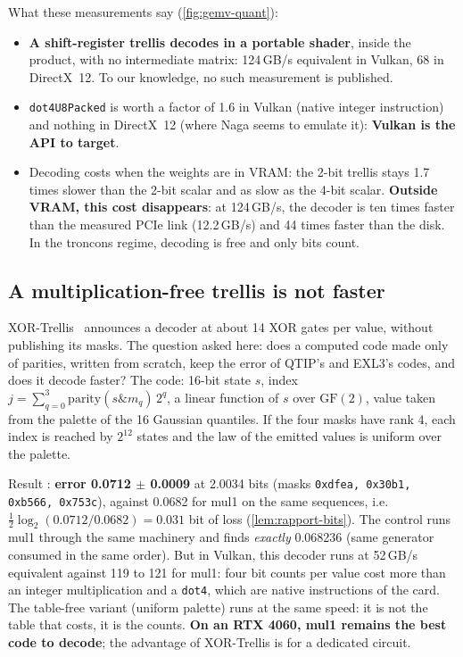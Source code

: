 What these measurements say (\cref{fig:gemv-quant}):
\begin{itemize}
\item \textbf{A shift-register trellis decodes in a portable shader}, inside the product, with no intermediate matrix: 124\,GB/s equivalent in Vulkan, 68 in DirectX~12. To our knowledge, no such measurement is published.
\item \texttt{dot4U8Packed} is worth a factor of 1.6 in Vulkan (native integer instruction) and nothing in DirectX~12 (where Naga seems to emulate it): \textbf{Vulkan is the API to target}.
\item Decoding costs when the weights are in VRAM: the 2-bit trellis stays 1.7 times slower than the 2-bit scalar and as slow as the 4-bit scalar. \textbf{Outside VRAM, this cost disappears}: at 124\,GB/s, the decoder is ten times faster than the measured PCIe link (12.2\,GB/s) and 44 times faster than the disk. In the troncons regime, decoding is free and only bits count.
\end{itemize}

\subsection{A multiplication-free trellis is not faster}

XOR-Trellis~\cite{xortrellis2026} announces a decoder at about 14 XOR gates per value, without publishing its masks. The question asked here: does a computed code made only of parities, written from scratch, keep the error of QTIP's and EXL3's codes, and does it decode faster? The code: 16-bit state $s$, index $j = \sum_{q=0}^{3} \mathrm{parity}(s \mathbin{\&} m_q)\, 2^q$, a linear function of $s$ over $\mathrm{GF}(2)$, value taken from the palette of the 16 Gaussian quantiles. If the four masks have rank 4, each index is reached by $2^{12}$ states and the law of the emitted values is uniform over the palette.

Result \mes: \textbf{error 0.0712 $\pm$ 0.0009} at 2.0034 bits (masks \texttt{0xdfea, 0x30b1, 0xb566, 0x753c}), against 0.0682 for mul1 on the same sequences, i.e.\ $\tfrac12\log_2(0.0712/0.0682) = 0.031$ bit of loss (\cref{lem:rapport-bits}). The control runs mul1 through the same machinery and finds \emph{exactly} 0.068236 (same generator consumed in the same order). But in Vulkan, this decoder runs at 52\,GB/s equivalent against 119 to 121 for mul1: four bit counts per value cost more than an integer multiplication and a \texttt{dot4}, which are native instructions of the card. The table-free variant (uniform palette) runs at the same speed: it is not the table that costs, it is the counts. \textbf{On an RTX 4060, mul1 remains the best code to decode}; the advantage of XOR-Trellis is for a dedicated circuit.

